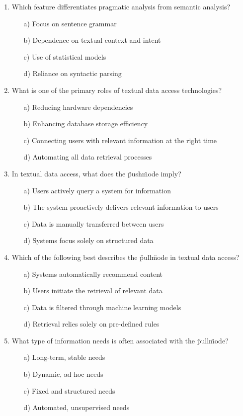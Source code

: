 \documentclass[8pt]{extarticle}
\begin{document}
\begin{multicols}{2}
\begin{enumerate}
\item Which feature differentiates pragmatic analysis from semantic analysis?
\begin{itemize}
    \item[a)] Focus on sentence grammar
    \item[b)] Dependence on textual context and intent
    \item[c)] Use of statistical models
    \item[d)] Reliance on syntactic parsing
\end{itemize}

\item What is one of the primary roles of textual data access technologies?
\begin{itemize}
    \item[a)] Reducing hardware dependencies
    \item[b)] Enhancing database storage efficiency
    \item[c)] Connecting users with relevant information at the right time
    \item[d)] Automating all data retrieval processes
\end{itemize}

\item In textual data access, what does the \"push\" mode imply?
\begin{itemize}
    \item[a)] Users actively query a system for information
    \item[b)] The system proactively delivers relevant information to users
    \item[c)] Data is manually transferred between users
    \item[d)] Systems focus solely on structured data
\end{itemize}

\item Which of the following best describes the \"pull\" mode in textual data access?
\begin{itemize}
    \item[a)] Systems automatically recommend content
    \item[b)] Users initiate the retrieval of relevant data
    \item[c)] Data is filtered through machine learning models
    \item[d)] Retrieval relies solely on pre-defined rules
\end{itemize}

\item What type of information needs is often associated with the \"pull\" mode?
\begin{itemize}
    \item[a)] Long-term, stable needs
    \item[b)] Dynamic, ad hoc needs
    \item[c)] Fixed and structured needs
    \item[d)] Automated, unsupervised needs
\end{itemize}


\end{enumerate}
\end{multicols}
\end{document}
